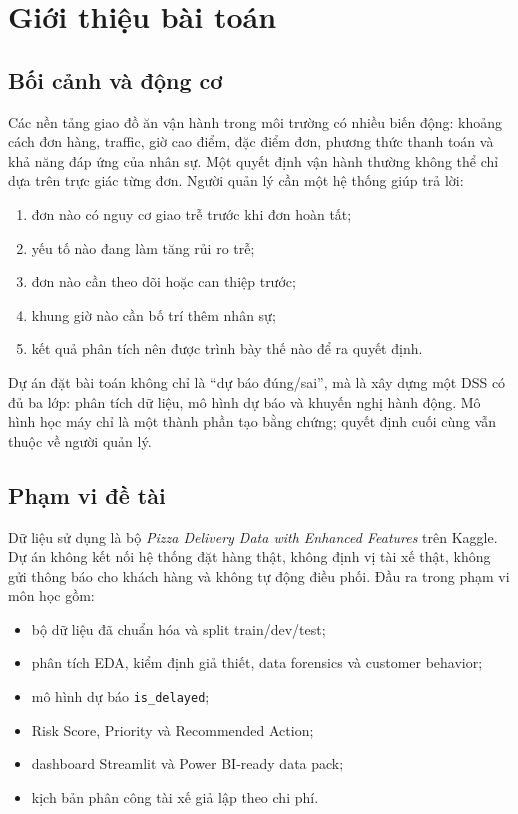 \documentclass[12pt,a4paper,oneside]{report}
\newcommand{\code}[1]{\nolinkurl{#1}}
\begin{document}
\tableofcontents
\listoffigures
\cleardoublepage
{}

\chapter{Giới thiệu bài toán}

\section{Bối cảnh và động cơ}

Các nền tảng giao đồ ăn vận hành trong môi trường có nhiều biến động: khoảng
cách đơn hàng, traffic, giờ cao điểm, đặc điểm đơn, phương thức thanh toán và
khả năng đáp ứng của nhân sự. Một quyết định vận hành thường không thể chỉ dựa
trên trực giác từng đơn. Người quản lý cần một hệ thống giúp trả lời:

\begin{enumerate}[leftmargin=*]
  \item đơn nào có nguy cơ giao trễ trước khi đơn hoàn tất;
  \item yếu tố nào đang làm tăng rủi ro trễ;
  \item đơn nào cần theo dõi hoặc can thiệp trước;
  \item khung giờ nào cần bố trí thêm nhân sự;
  \item kết quả phân tích nên được trình bày thế nào để ra quyết định.
\end{enumerate}

Dự án đặt bài toán không chỉ là ``dự báo đúng/sai'', mà là xây dựng một DSS có
đủ ba lớp: phân tích dữ liệu, mô hình dự báo và khuyến nghị hành động. Mô hình
học máy chỉ là một thành phần tạo bằng chứng; quyết định cuối cùng vẫn thuộc về
người quản lý.

\section{Phạm vi đề tài}

Dữ liệu sử dụng là bộ \emph{Pizza Delivery Data with Enhanced Features} trên
Kaggle. Dự án không kết nối hệ thống đặt hàng thật, không định vị tài xế thật,
không gửi thông báo cho khách hàng và không tự động điều phối. Đầu ra trong
phạm vi môn học gồm:

\begin{itemize}[leftmargin=*]
  \item bộ dữ liệu đã chuẩn hóa và split train/dev/test;
  \item phân tích EDA, kiểm định giả thiết, data forensics và customer behavior;
  \item mô hình dự báo \code{is\_delayed};
  \item Risk Score, Priority và Recommended Action;
  \item dashboard Streamlit và Power BI-ready data pack;
  \item kịch bản phân công tài xế giả lập theo chi phí.
\end{itemize}
\end{document}

